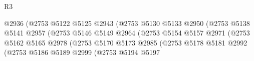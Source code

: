 \begin{lexlean}{R3}
\begin{coremodule}
                                                  @2936
                                                  (@2753
                                                    @5122
                                                    @5125
                                                    @2943
                                                    (@2753
                                                      @5130
                                                      @5133
                                                      @2950
                                                      (@2753
                                                        @5138
                                                        @5141
                                                        @2957
                                                        (@2753
                                                          @5146
                                                          @5149
                                                          @2964
                                                          (@2753
                                                            @5154
                                                            @5157
                                                            @2971
                                                            (@2753
                                                              @5162
                                                              @5165
                                                              @2978
                                                              (@2753
                                                                @5170
                                                                @5173
                                                                @2985
                                                                (@2753
                                                                  @5178
                                                                  @5181
                                                                  @2992
                                                                  (@2753
                                                                    @5186
                                                                    @5189
                                                                    @2999
                                                                    (@2753
                                                                      @5194
                                                                      @5197

\end{coremodule}
\end{lexlean}
